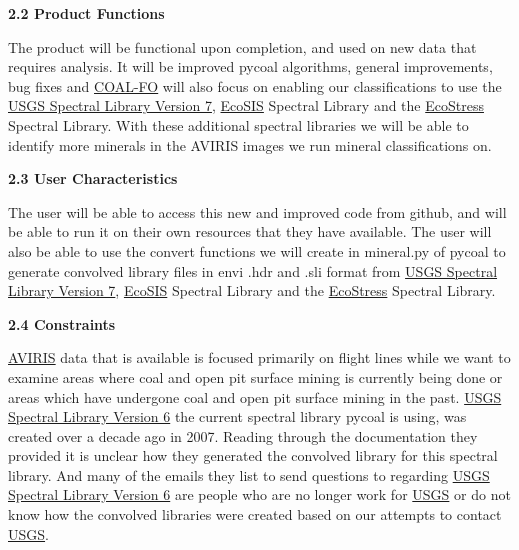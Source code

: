 \documentclass[a4paper,12pt]{article}
\begin{document}
\noindent \textbf{2.2 Product Functions}\newline


\noindent The product will be functional upon completion, and used on new data that requires analysis. It will be improved pycoal algorithms, general improvements, bug fixes and  \href{https://capstone-coal.github.io/team}{COAL-FO} will also focus on enabling our classifications to use the \href{https://speclab.cr.usgs.gov/spectral-lib.html}{USGS Spectral Library Version 7}, \href{https://ecosis.org/}{EcoSIS} Spectral Library and the \href{https://speclib.jpl.nasa.gov/}{EcoStress} Spectral Library.  With these additional spectral libraries we will be able to identify more minerals in the AVIRIS images we run mineral classifications on.\newline


\noindent \textbf{2.3 User Characteristics}\newline


\noindent The user will be able to access this new and improved code from github, and will be able to run it on their own resources that they have available.\newline
\noindent The user will also be able to use the convert functions we will create in mineral.py of pycoal to generate convolved library files in envi .hdr and .sli format from \href{https://speclab.cr.usgs.gov/spectral-lib.html}{USGS Spectral Library Version 7}, \href{https://ecosis.org/}{EcoSIS} Spectral Library and the \href{https://speclib.jpl.nasa.gov/}{EcoStress} Spectral Library. \newline


\noindent \textbf{2.4 Constraints}\newline

\noindent \href{https://aviris.jpl.nasa.gov/}{AVIRIS} data that is available is focused primarily on flight lines while we want to examine areas where coal and open pit surface mining is currently being done or areas which have undergone coal and open pit surface mining in the past. \newline
\noindent \href{https://speclab.cr.usgs.gov/spectral.lib06/ds231/index.html}{USGS Spectral Library Version 6} the current spectral library pycoal is using, was created over a decade ago in 2007. Reading through the documentation they provided it is unclear how they generated the convolved library for this spectral library. And many of the emails they list to send questions to regarding \href{https://speclab.cr.usgs.gov/spectral.lib06/ds231/index.html}{USGS Spectral Library Version 6} are people who are no longer work for \href{https://www.usgs.gov/}{USGS} or do not know how the convolved libraries were created based on our attempts to contact \href{https://www.usgs.gov/}{USGS}. \newline
\end{document}
